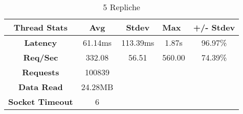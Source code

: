 \begin{table}[H]
\caption{5 Repliche}
\centering
\begin{tabular}{|c|c|ccc}
\hline
\textbf{Thread Stats}   & \textbf{Avg} & \multicolumn{1}{c|}{\textbf{Stdev}} & \multicolumn{1}{l|}{\textbf{Max}} & \multicolumn{1}{l|}{\textbf{+/- Stdev}} \\ \hline
\textbf{Latency}        & 61.14ms      & \multicolumn{1}{c|}{113.39ms}       & \multicolumn{1}{c|}{1.87s}        & \multicolumn{1}{c|}{96.97\%}            \\ \hline
\textbf{Req/Sec}        & 332.08       & \multicolumn{1}{c|}{56.51}          & \multicolumn{1}{c|}{560.00}       & \multicolumn{1}{c|}{74.39\%}            \\ \hline
\textbf{Requests}       & 100839       &                                     &                                   &                                         \\ \cline{1-2}
\textbf{Data Read}      & 24.28MB      &                                     &                                   &                                         \\ \cline{1-2}
\textbf{Socket Timeout} & 6            &                                     &                                   &                                         \\ \cline{1-2}
\end{tabular}
\end{table}